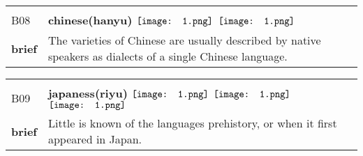 \documentclass[UTF8]{article}
\begin{document}
            \begin{tabularx}{\textwidth}{p{1.5cm}X}
            \arrayrulecolor{myBlue}
        	\hline\\
            \small{B08}&
            \large{\bfseries{chinese(hanyu)}}\hfill
                                                            \phantom{$\vcenter{\hbox{\texttt{[image: 1.png]}}}$}
                                                                \phantom{$\vcenter{\hbox{\texttt{[image: 1.png]}}}$}
                                                                $\vcenter{\hbox{\texttt{[image: 1.png]}}}$
                                                                \phantom{$\vcenter{\hbox{\texttt{[image: 1.png]}}}$}
                                                                \phantom{$\vcenter{\hbox{\texttt{[image: 1.png]}}}$}
                                                                $\vcenter{\hbox{\texttt{[image: 1.png]}}}$
                                                                \phantom{$\vcenter{\hbox{\texttt{[image: 1.png]}}}$}
                                        \\[10pt]
            \large{\bfseries{brief}}&\noindent\parbox[c]{\hsize}{The varieties of Chinese are usually described by native speakers as dialects of a single Chinese language.} \\[5pt]
            \hline\\[-10pt]
        \end{tabularx}
            \begin{tabularx}{\textwidth}{p{1.5cm}X}
            \arrayrulecolor{myBlue}
        	\hline\\
            \small{B09}&
            \large{\bfseries{japaness(riyu)}}\hfill
                                                            \phantom{$\vcenter{\hbox{\texttt{[image: 1.png]}}}$}
                                                                \phantom{$\vcenter{\hbox{\texttt{[image: 1.png]}}}$}
                                                                $\vcenter{\hbox{\texttt{[image: 1.png]}}}$
                                                                \phantom{$\vcenter{\hbox{\texttt{[image: 1.png]}}}$}
                                                                \phantom{$\vcenter{\hbox{\texttt{[image: 1.png]}}}$}
                                                                $\vcenter{\hbox{\texttt{[image: 1.png]}}}$
                                                                $\vcenter{\hbox{\texttt{[image: 1.png]}}}$
                                        \\[10pt]
            \large{\bfseries{brief}}&\noindent\parbox[c]{\hsize}{Little is known of the languages prehistory, or when it first appeared in Japan. } \\[5pt]
            \hline\\[-10pt]
        \end{tabularx}
\end{document}
